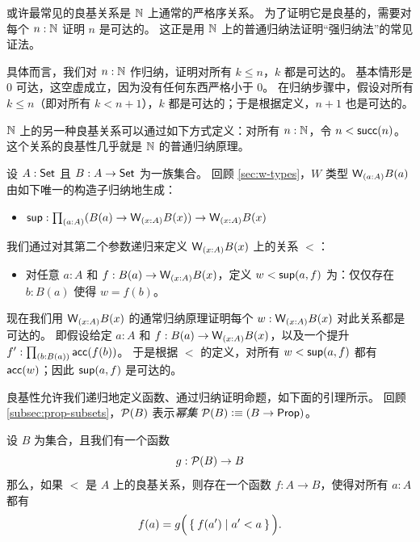 \begin{eg}\label{thm:nat-wf}
  或许最常见的良基关系是 $\mathbb{N}$ 上通常的严格序关系。
  为了证明它是良基的，需要对每个 $n:\mathbb{N}$ 证明 $n$ 是可达的。
  这正是用 $\mathbb{N}$ 上的普通归纳法证明``强归纳法''的常见证法。

  具体而言，我们对 $n:\mathbb{N}$ 作归纳，证明对所有 $k\le n$，$k$ 都是可达的。
  基本情形是 $0$ 可达，这空虚成立，因为没有任何东西严格小于 $0$。
  在归纳步骤中，假设对所有 $k\le n$（即对所有 $k < n+1$），$k$ 都是可达的；于是根据定义，$n+1$ 也是可达的。

  $\mathbb{N}$ 上的另一种良基关系可以通过如下方式定义：对所有 $n:\mathbb{N}$，令 $n < \mathsf{succ}(n)$。
  这个关系的良基性几乎就是 $\mathbb{N}$ 的普通归纳原理。
\end{eg}

\begin{eg}\label{thm:wtype-wf}
  设 $A:\mathsf{Set}$ 且 $B : A \to \mathsf{Set}$ 为一族集合。
  回顾 \cref{sec:w-types}，$W$ 类型 $\wtype{a:A} B(a)$ 由如下唯一的构造子归纳地生成：
  \begin{itemize}
  \item $\supp : \prd{a:A} (B(a) \to \wtype{x:A} B(x)) \to \wtype{x:A} B(x)$
  \end{itemize}
  我们通过对其第二个参数递归来定义 $\wtype{x:A} B(x)$ 上的关系 $<$：
  \begin{itemize}
  \item 对任意 $a:A$ 和 $f:B(a) \to \wtype{x:A} B(x)$，定义 $w<{\mathsf{sup}}(a,f)$ 为：仅仅存在 $b:B(a)$ 使得 $w = f(b)$。
  \end{itemize}
  现在我们用 $\wtype{x:A}B(x)$ 的通常归纳原理证明每个 $w:\wtype{x:A} B(x)$ 对此关系都是可达的。
  即假设给定 $a:A$ 和 $f:B(a) \to \wtype{x:A} B(x)$，以及一个提升 $f' : \prd{b:B(a)} \acc(f(b))$。
  于是根据 $<$ 的定义，对所有 $w<{\mathsf{sup}}(a,f)$ 都有 $\mathsf{acc}(w)$；因此 ${\mathsf{sup}}(a,f)$ 是可达的。
\end{eg}

良基性允许我们递归地定义函数、通过归纳证明命题，如下面的引理所示。
回顾 \cref{subsec:prop-subsets}，$\mathcal{P}(B)$ 表示\emph{幂集} $\mathcal{P}(B) \vcentcolon\equiv (B\to\mathsf{Prop})$。

\begin{lem}\label{thm:wfrec}
  设 $B$ 为集合，且我们有一个函数
  \[ g : \mathcal{P}(B) \to B \]
  那么，如果 $<$ 是 $A$ 上的良基关系，则存在一个函数 $f:A\to B$，使得对所有 $a:A$ 都有
  \begin{equation*}
    f(a) = g\Big(\Set{ f(a') | a'<a }\Big).
  \end{equation*}
\end{lem}


